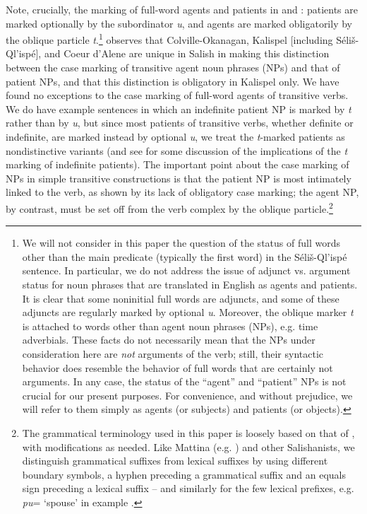 \documentclass[output=paper,colorlinks,citecolor=brown]{langscibook}
\begin{document}
  Note, crucially, the marking of full-word agents and patients in 
  and : patients are marked optionally by the subordinator
  \emph{{\textltilde}u}, and agents are marked obligatorily by the
  oblique particle \emph{t}.\footnote{We will not consider in this
  paper the question of the status of full words other than the main
  predicate (typically the first word) in the S\'eli\v{s}-Ql'isp\'e
  sentence.  In particular, we do not address the issue of adjunct
  vs. argument status for noun phrases that are translated in English
  as agents and patients.  It is clear that some noninitial full
  words are adjuncts, and some of these adjuncts are regularly marked
  by optional \emph{{\textltilde}u}.  Moreover, the oblique marker
  \emph{t} is attached to words other than agent noun phrases (NPs),
  e.g.  time adverbials.  These facts do not necessarily mean that
  the NPs under consideration here are \emph{not} arguments of the
  verb; still, their syntactic behavior does resemble the behavior of
  full words that are certainly not arguments.  In any case, the
  status of the ``agent'' and ``patient'' NPs is not crucial for our
  present purposes.  For convenience, and without prejudice, we will
  refer to them simply as agents (or subjects) and patients (or
  objects).} \citet[52--53]{Kroeber:1999} observes that Colville-Okanagan,
  Kalispel [including S\'eli\v{s}-Ql'isp\'e], and Coeur d'Alene are
  unique in Salish in making this distinction between the case
  marking of transitive agent noun phrases (NPs) and that of patient
  NPs, and that this distinction is obligatory in Kalispel only.  We
  have found no exceptions to the case marking of full-word agents of
  transitive verbs.  We do have example sentences in which an
  indefinite patient NP is marked by \emph{t} rather than by \emph{{\textltilde}u}, but since most patients of transitive verbs,
  whether definite or indefinite, are marked instead by optional \emph{{\textltilde}u}, we treat the \emph{t}-marked patients as
  nondistinctive variants (and see  for some discussion of the
  implications of the \emph{t} marking of indefinite patients).  The
  important point about the case marking of NPs in simple transitive
  constructions is that the patient NP is most intimately linked to
  the verb, as shown by its lack of obligatory case marking; the
  agent NP, by contrast, must be set off from the verb complex by the
  oblique particle.\footnote{The grammatical terminology used in
  this paper is loosely based on that of \citet{Carlson:1972}, with
  modifications as needed.  Like Mattina (e.g. \citealt{Mattina:1987}) and other
  Salishanists, we distinguish grammatical suffixes from lexical
  suffixes by using different boundary symbols, a hyphen preceding a
  grammatical suffix and an equals sign preceding a lexical
  suffix -- and similarly for the few lexical prefixes, e.g. \emph{pu\textglotstop}= `spouse' in example .}
\end{document}
